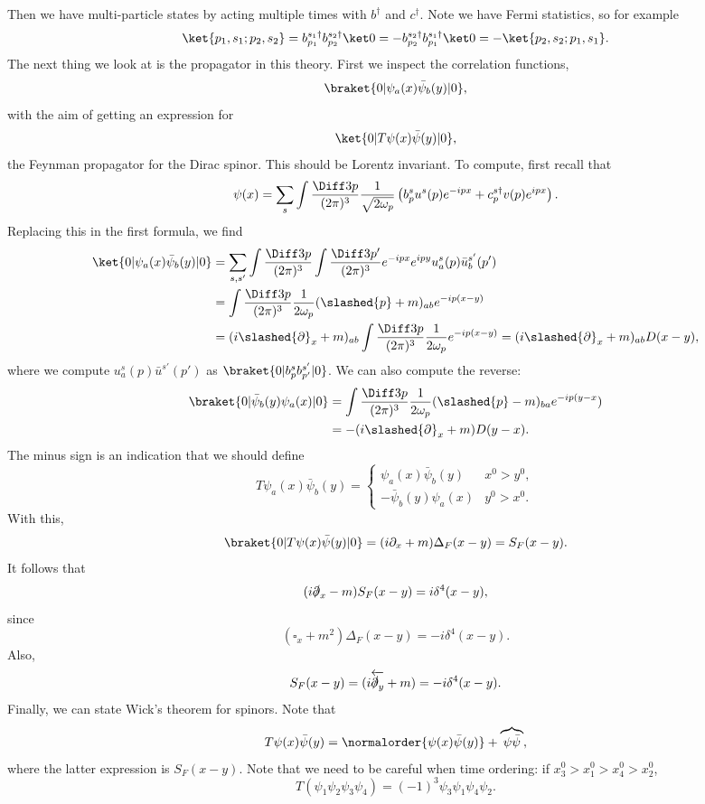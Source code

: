 \documentclass[12pt]{article}
\begin{document}
Then we have multi-particle states by acting multiple times with $b^{\dagger}$ and $c^{\dagger}$. Note we have Fermi statistics, so for example
\[
	\ket{p_1, s_1; p_2 , s_2} = b_{p_1}^{s_1\dagger} b_{p_2}^{s_2\dagger} \ket 0 = - b_{p_2}^{s_2\dagger} b_{p_1}^{s_1\dagger} \ket 0 = - \ket{p_2, s_2; p_1, s_1}.
\]
The next thing we look at is the propagator in this theory. First we inspect the correlation functions,
\[
	\braket{0|\psi_a(x) \bar \psi_b(y)|0},
\]
with the aim of getting an expression for
\[
	\ket{0|T \psi(x) \bar \psi(y)| 0},
\]
the Feynman propagator for the Dirac spinor. This should be Lorentz invariant. To compute, first recall that
\[
	\psi(x) = \sum_s \int \frac{\Diff 3 p}{(2\pi)^3} \frac{1}{\sqrt{2 \omega_p}}\left( b_p^{s} u^{s}(p) e^{-ipx} + c_p^{s\dagger} v(p) e^{ipx} \right).
\]
Replacing this in the first formula, we find
\begin{align*}
	\ket{0|\psi_a(x) \bar \psi_b(y)|0} &= \sum_{s, s'} \int \frac{\Diff 3p}{(2\pi)^3} \int \frac{\Diff 3 p'}{(2 \pi)^3} e^{-ipx} e^{ipy} u_a^{s}(p) \bar u_b^{s'}(p') \\
					   &= \int \frac{\Diff 3 p}{(2\pi)^3} \frac{1}{2 \omega_p} (\slashed{p} + m)_{ab} e^{-ip(x - y)} \\
					   &= (i \slashed{\partial}_x + m)_{ab} \int \frac{\Diff 3 p}{(2 \pi)^3} \frac{1}{2\omega_p} e^{-ip(x-y)} = (i \slashed{\partial}_x + m)_{ab} D(x - y),
\end{align*}
where we compute $u_a^{s}(p) \bar u^{s'}(p')$ as $\braket{0|b_p^{s} b_{p'}^{s'}|0}$. We can also compute the reverse:
\begin{align*}
	\braket{0|\bar \psi_b(y) \psi_a(x)|0} &= \int \frac{\Diff 3 p}{(2 \pi)^3} \frac{1}{2\omega_p} (\slashed{p} - m)_{ba} e^{-ip(y - x}) \\
					      &= -(i \slashed{\partial}_x + m) D(y - x).
\end{align*}
The minus sign is an indication that we should define
\[
T \psi_a(x) \bar \psi_b(y) =
\begin{cases}
	\psi_a(x) \bar \psi_b(y) & x^{0} > y^{0}, \\
	- \bar \psi_b(y) \psi_a(x) & y^{0} > x^{0}.
\end{cases}
\]
With this,
\[
	\braket{0|T \psi(x) \bar \psi(y)|0} = (i \partial_x + m) \Delta_F(x - y) = S_F(x - y).
\]
It follows that
\[
	(i \slashed{\partial}_x - m) S_F(x - y) = i \delta^{4}(x - y),
\]
since
\[
	(\square_x + m^2) \Delta_F(x - y) = - i \delta^{4}(x - y).
\]
Also,
\[
	S_F(x - y) = (i \overleftarrow{\slashed{\partial}_y} + m) = - i \delta^{4}(x - y).
\]
Finally, we can state Wick's theorem for spinors. Note that
\[
	T \psi(x) \bar \psi(y) = \normalorder{\psi(x) \bar \psi(y)} + \overbrace{\psi \bar \psi},
\]
where the latter expression is $S_F(x - y)$. Note that we need to be careful when time ordering: if $x_3^{0} > x_1^{0} > x_4^{0} > x_2^{0}$,
\[
T(\psi_1 \psi_2 \psi_3 \psi_4) = (-1)^3 \psi_3 \psi_1 \psi_4 \psi_2.
\]
\end{document}
